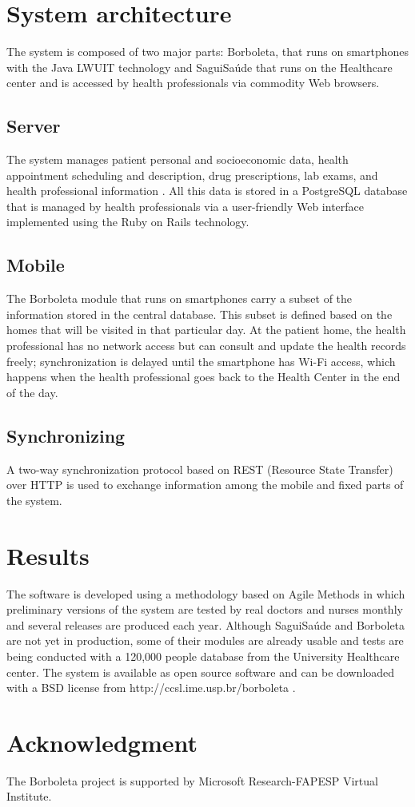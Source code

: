 \documentclass[12pt]{article}
\begin{document}
\section{System architecture}
The system is composed of two major parts: Borboleta, that runs on smartphones with the Java LWUIT technology and SaguiSaúde that runs on the Healthcare center and is accessed by health professionals via commodity Web browsers.

\subsection{Server}
The system manages patient personal and socioeconomic data, health appointment scheduling and description, drug prescriptions, lab exams, and health professional information 
\cite{sagui}. All this data is stored in a PostgreSQL database that is managed by health professionals via a user-friendly Web interface implemented using the Ruby on Rails technology.

\subsection{Mobile}
The Borboleta module 
\cite{borboleta} that runs on smartphones carry a subset of the information stored in the central database. This subset is defined based on the homes that will be visited in that particular day. At the patient home, the health professional has no network access but can consult and update the health records freely; synchronization is delayed until the smartphone has Wi-Fi access, which happens when the health professional goes back to the Health Center in the end of the day. 

\subsection{Synchronizing}
A two-way synchronization protocol based on REST (Resource State Transfer) over HTTP is used to exchange information among the mobile and fixed parts of the system.




\section{Results}
The software is developed using a methodology based on Agile Methods in which preliminary versions of the system are tested by real doctors and nurses monthly and several releases are produced each year. Although SaguiSaúde and Borboleta are not yet in production, some of their modules are already usable and tests are being conducted with a 120,000 people database from the University Healthcare center. The system is available as open source software and can be downloaded with a BSD license from http://ccsl.ime.usp.br/borboleta .

\section{Acknowledgment}
The Borboleta project is supported by Microsoft Research-FAPESP Virtual Institute.



\end{document}
